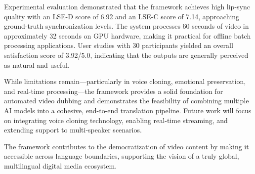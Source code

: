 \documentclass[conference]{IEEEtran}
\begin{document}
Experimental evaluation demonstrated that the framework achieves high lip-sync quality with an LSE-D score of 6.92 and an LSE-C score of 7.14, approaching ground-truth synchronization levels. The system processes 60 seconds of video in approximately 32 seconds on GPU hardware, making it practical for offline batch processing applications. User studies with 30 participants yielded an overall satisfaction score of 3.92/5.0, indicating that the outputs are generally perceived as natural and useful.

While limitations remain---particularly in voice cloning, emotional preservation, and real-time processing---the framework provides a solid foundation for automated video dubbing and demonstrates the feasibility of combining multiple AI models into a cohesive, end-to-end translation pipeline. Future work will focus on integrating voice cloning technology, enabling real-time streaming, and extending support to multi-speaker scenarios.

The framework contributes to the democratization of video content by making it accessible across language boundaries, supporting the vision of a truly global, multilingual digital media ecosystem.
\end{document}

